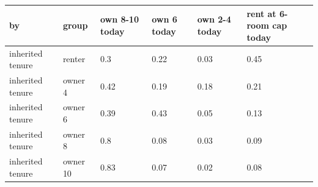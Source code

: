 \begingroup\small
\setlength{\tabcolsep}{3pt}
\renewcommand{\arraystretch}{1.04}
\begin{tabularx}{\linewidth}{XXXXXX}
\toprule
by & group & own 8-10 today & own 6 today & own 2-4 today & rent at 6-room cap today \\
\midrule
inherited tenure & renter & 0.3 & 0.22 & 0.03 & 0.45 \\
inherited tenure & owner 4 & 0.42 & 0.19 & 0.18 & 0.21 \\
inherited tenure & owner 6 & 0.39 & 0.43 & 0.05 & 0.13 \\
inherited tenure & owner 8 & 0.8 & 0.08 & 0.03 & 0.09 \\
inherited tenure & owner 10 & 0.83 & 0.07 & 0.02 & 0.08 \\
\bottomrule
\end{tabularx}
\endgroup
